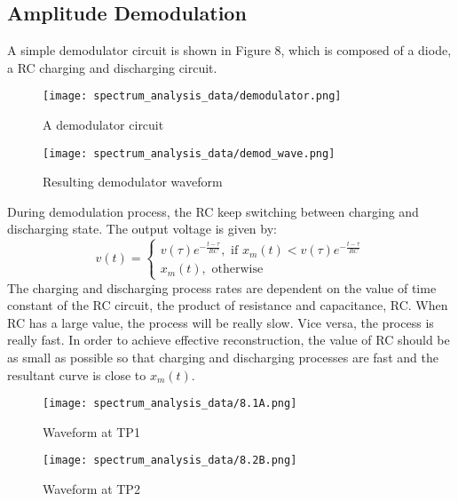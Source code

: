 \documentclass[12pt]{article}[times]
\begin{document}
\newpage
\subsection{Amplitude Demodulation}
A simple demodulator circuit is shown in Figure 8, which is 
composed of a diode, a RC charging and discharging circuit.
\noindent %
\begin{figure}[h]
  \centering
  \begin{minipage}{0.45\textwidth}
    \texttt{[image: spectrum\_analysis\_data/demodulator.png]}
    \caption{A demodulator circuit}
  \end{minipage}
  \hfill %
  \begin{minipage}{0.45\textwidth}
    \texttt{[image: spectrum\_analysis\_data/demod\_wave.png]}
    \caption{Resulting demodulator waveform}
  \end{minipage}
\end{figure}
\newline
During demodulation process, the RC keep switching between charging
and discharging state. The output voltage is given by:
\begin{equation}
  v(t) = \begin{cases}
  v(\tau)e^{-\frac{t-\tau}{RC}}, \text{ if } x_m(t) < v(\tau)e^{-\frac{t-\tau}{RC}} \\
  x_m(t), \text{ otherwise}
  \end{cases}
\end{equation}
The charging and discharging process rates are dependent on the 
value of time constant of the RC circuit, the product of resistance
and capacitance, RC. When RC has a large value, the process will 
be really slow. Vice versa, the process is really fast. In order 
to achieve effective reconstruction, the value of RC should be 
as small as possible so that charging and discharging processes
are fast and the resultant curve is close to $x_m(t)$.

\begin{figure}[h]
  \centering
  \begin{minipage}{0.45\textwidth}
    \texttt{[image: spectrum\_analysis\_data/8.1A.png]}
    \caption{Waveform at TP1}
  \end{minipage}
  \hfill %
  \begin{minipage}{0.45\textwidth}
    \texttt{[image: spectrum\_analysis\_data/8.2B.png]}
    \caption{Waveform at TP2}
  \end{minipage}
\end{figure}
\end{document}
